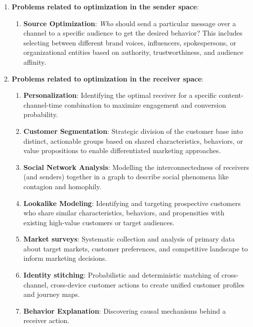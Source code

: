 \begin{enumerate}
\item \textbf{Problems related to optimization in the sender space}:
    \begin{enumerate}
        \item \textbf{Source Optimization}: \textit{Who} should send a particular message over a channel to a specific audience to get the desired behavior? This includes selecting between different brand voices, influencers, spokespersons, or organizational entities based on authority, trustworthiness, and audience affinity.
    \end{enumerate}
    

\item \textbf{Problems related to optimization in the receiver space}:
    \begin{enumerate}
        \item \textbf{Personalization}: Identifying the optimal receiver for a specific content-channel-time combination to maximize engagement and conversion probability.
        \item \textbf{Customer Segmentation}: Strategic division of the customer base into distinct, actionable groups based on shared characteristics, behaviors, or value propositions to enable differentiated marketing approaches.
        \item \textbf{Social Network Analysis}: Modelling the interconnectedness of receivers (and senders) together in a graph to describe social phenomena like contagion and homophily.
        \item \textbf{Lookalike Modeling}:  Identifying and targeting prospective customers who share similar characteristics, behaviors, and propensities with existing high-value customers or target audiences.
        \item \textbf{Market surveys}: Systematic collection and analysis of primary data about target markets, customer preferences, and competitive landscape to inform marketing decisions.
        \item \textbf{Identity stitching}: Probabilistic and deterministic matching of cross-channel, cross-device customer actions to create unified customer profiles and journey maps.
        \item \textbf{Behavior Explanation}: Discovering causal mechanisms behind a receiver action.
    \end{enumerate}
    

\end{enumerate}
